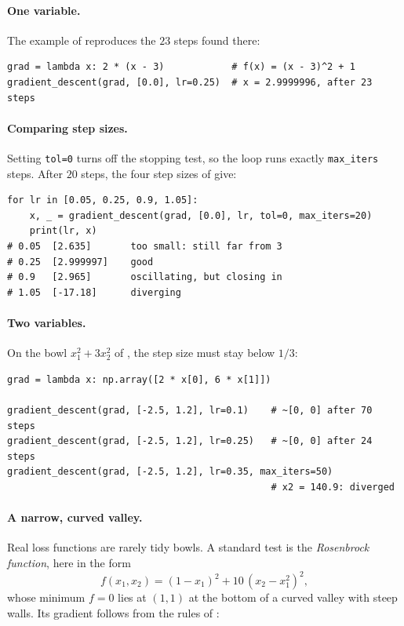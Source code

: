\paragraph{One variable.}
The example of  reproduces the $23$ steps
found there:

\begin{lstlisting}
grad = lambda x: 2 * (x - 3)            # f(x) = (x - 3)^2 + 1
gradient_descent(grad, [0.0], lr=0.25)  # x = 2.9999996, after 23 steps
\end{lstlisting}

\paragraph{Comparing step sizes.}
Setting \texttt{tol=0} turns off the stopping test, so the loop runs
exactly \texttt{max\_iters} steps. After $20$ steps, the four step sizes of
 give:

\begin{lstlisting}
for lr in [0.05, 0.25, 0.9, 1.05]:
    x, _ = gradient_descent(grad, [0.0], lr, tol=0, max_iters=20)
    print(lr, x)
# 0.05  [2.635]       too small: still far from 3
# 0.25  [2.999997]    good
# 0.9   [2.965]       oscillating, but closing in
# 1.05  [-17.18]      diverging
\end{lstlisting}

\paragraph{Two variables.}
On the bowl $x_1^2 + 3x_2^2$ of , the step size
must stay below $1/3$:

\begin{lstlisting}
grad = lambda x: np.array([2 * x[0], 6 * x[1]])

gradient_descent(grad, [-2.5, 1.2], lr=0.1)    # ~[0, 0] after 70 steps
gradient_descent(grad, [-2.5, 1.2], lr=0.25)   # ~[0, 0] after 24 steps
gradient_descent(grad, [-2.5, 1.2], lr=0.35, max_iters=50)
                                               # x2 = 140.9: diverged
\end{lstlisting}

\paragraph{A narrow, curved valley.}
Real loss functions are rarely tidy bowls. A standard test is the
\emph{Rosenbrock function}, here in the form
\[
  f(x_1, x_2) = (1 - x_1)^2 + 10\,(x_2 - x_1^2)^2 ,
\]
whose minimum $f = 0$ lies at $(1, 1)$ at the bottom of a curved valley
with steep walls. Its gradient follows from the rules of
:

